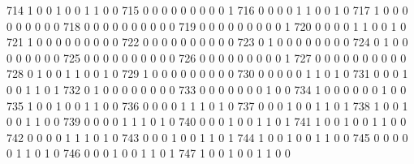 \documentclass[compress,8pt]{beamer}
\begin{document}
\begin{frame}
\begin{Schunk}
  714      1       0   0              1        0    0       1       1   0   0
  715      0       0   0              0        0    0       0       0   0   1
  716      0       0   0              0        1    1       0       0   1   0
  717      1       0   0              0        0    0       0       0   0   0
  718      0       0   0              0        0    0       0       0   0   0
  719      0       0   0              0        0    0       0       0   0   1
  720      0       0   0              0        1    1       0       0   1   0
  721      1       0   0              0        0    0       0       0   0   0
  722      0       0   0              0        0    0       0       0   0   0
  723      0       1   0              0        0    0       0       0   0   0
  724      0       1   0              0        0    0       0       0   0   0
  725      0       0   0              0        0    0       0       0   0   0
  726      0       0   0              0        0    0       0       0   0   1
  727      0       0   0              0        0    0       0       0   0   0
  728      0       1   0              0        1    1       0       0   1   0
  729      1       0   0              0        0    0       0       0   0   0
  730      0       0   0              0        0    1       1       0   1   0
  731      0       0   0              1        0    0       1       1   0   1
  732      0       1   0              0        0    0       0       0   0   0
  733      0       0   0              0        0    0       0       1   0   0
  734      1       0   0              0        0    0       0       1   0   0
  735      1       0   0              1        0    0       1       1   0   0
  736      0       0   0              0        1    1       1       0   1   0
  737      0       0   0              1        0    0       1       1   0   1
  738      1       0   0              1        0    0       1       1   0   0
  739      0       0   0              0        1    1       1       0   1   0
  740      0       0   0              1        0    0       1       1   0   1
  741      1       0   0              1        0    0       1       1   0   0
  742      0       0   0              0        1    1       1       0   1   0
  743      0       0   0              1        0    0       1       1   0   1
  744      1       0   0              1        0    0       1       1   0   0
  745      0       0   0              0        0    1       1       0   1   0
  746      0       0   0              1        0    0       1       1   0   1
  747      1       0   0              1        0    0       1       1   0   0

\end{Schunk}
\end{frame}
\end{document}
